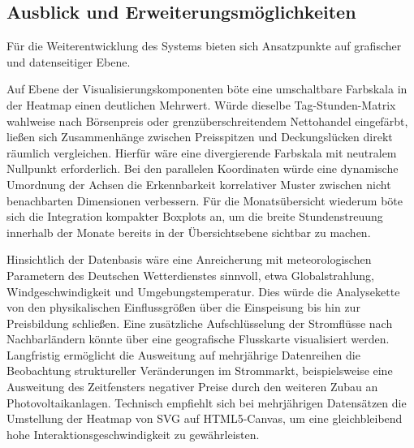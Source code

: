 \subsection*{Ausblick und Erweiterungsmöglichkeiten}

Für die Weiterentwicklung des Systems bieten sich Ansatzpunkte auf grafischer und datenseitiger Ebene.

Auf Ebene der Visualisierungskomponenten böte eine umschaltbare Farbskala in der Heatmap einen deutlichen Mehrwert. Würde dieselbe Tag-Stunden-Matrix wahlweise nach Börsenpreis oder grenzüberschreitendem Nettohandel eingefärbt, ließen sich Zusammenhänge zwischen Preisspitzen und Deckungslücken direkt räumlich vergleichen. Hierfür wäre eine divergierende Farbskala mit neutralem Nullpunkt erforderlich. Bei den parallelen Koordinaten würde eine dynamische Umordnung der Achsen die Erkennbarkeit korrelativer Muster zwischen nicht benachbarten Dimensionen verbessern. Für die Monatsübersicht wiederum böte sich die Integration kompakter Boxplots an, um die breite Stundenstreuung innerhalb der Monate bereits in der Übersichtsebene sichtbar zu machen.

Hinsichtlich der Datenbasis wäre eine Anreicherung mit meteorologischen Parametern des Deutschen Wetterdienstes sinnvoll, etwa Globalstrahlung, Windgeschwindigkeit und Umgebungstemperatur. Dies würde die Analysekette von den physikalischen Einflussgrößen über die Einspeisung bis hin zur Preisbildung schließen. Eine zusätzliche Aufschlüsselung der Stromflüsse nach Nachbarländern könnte über eine geografische Flusskarte visualisiert werden. Langfristig ermöglicht die Ausweitung auf mehrjährige Datenreihen die Beobachtung struktureller Veränderungen im Strommarkt, beispielsweise eine Ausweitung des Zeitfensters negativer Preise durch den weiteren Zubau an Photovoltaikanlagen. Technisch empfiehlt sich bei mehrjährigen Datensätzen die Umstellung der Heatmap von SVG auf HTML5-Canvas, um eine gleichbleibend hohe Interaktionsgeschwindigkeit zu gewährleisten.
